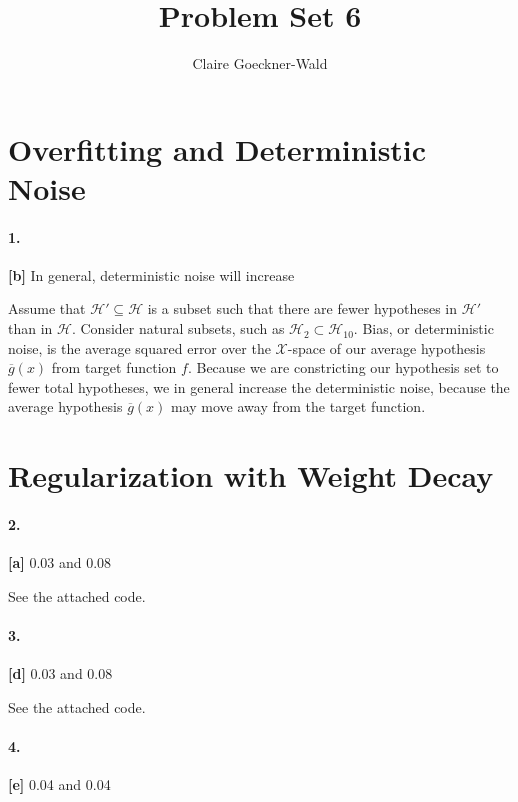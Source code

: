 \documentclass[10pt,letter]{article}
\begin{document}
\title{Problem Set 6}
\author{Claire Goeckner-Wald}
\maketitle 

\section*{Overfitting and Deterministic Noise}

\paragraph{1.} \textbf{[b]} In general, deterministic noise will increase

	Assume that $\mathcal H' \subseteq \mathcal H$ is a subset such that there are fewer hypotheses in $\mathcal H'$ than in $\mathcal H$. Consider natural subsets, such as $\mathcal H_2 \subset \mathcal H_10$. Bias, or deterministic noise, is the average squared error over the $\mathcal X$-space of our average hypothesis $\overline g(x)$ from target function $f$. Because we are constricting our hypothesis set to fewer total hypotheses, we in general increase the deterministic noise, because the average hypothesis $\overline g(x)$ may move away from the target function. 

\section*{Regularization with Weight Decay}

\paragraph{2.} \textbf{[a]} 0.03 and 0.08

	See the attached code. 

\paragraph{3.} \textbf{[d]} 0.03 and 0.08

	See the attached code. 

\paragraph{4.} \textbf{[e]} 0.04 and 0.04
\end{document}
